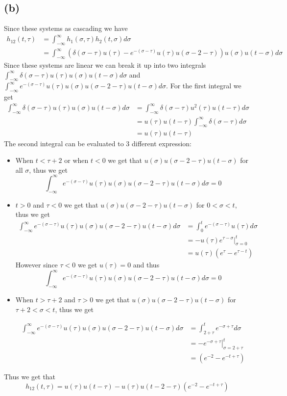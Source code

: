 \documentclass[12pt]{article}
\begin{document}
\subsection*{(b)}
Since these systems as cascading we have
\begin{align*}
h_{12}(t,\tau)&=\int_{-\infty}^{\infty}h_1(\sigma,\tau)h_2(t,\sigma)d\sigma\\
&=\int_{-\infty}^{\infty}\left(\delta(\sigma-\tau)u(\tau)-e^{-(\sigma-\tau)}u(\tau)u(\sigma-2-\tau)\right)u(\sigma)u(t-\sigma)d\sigma
\end{align*}
Since these systems are linear we can break it up into two integrals $\int_{-\infty}^{\infty}\delta(\sigma-\tau)u(\tau)u(\sigma)u(t-\sigma)d\sigma$ and $\int_{-\infty}^{\infty}e^{-(\sigma-\tau)}u(\tau)u(\sigma)u(\sigma-2-\tau)u(t-\sigma)d\sigma$. For the first integral we get
\begin{align*}
\int_{-\infty}^{\infty}\delta(\sigma-\tau)u(\tau)u(\sigma)u(t-\sigma)d\sigma&=\int_{-\infty}^{\infty}\delta(\sigma-\tau)u^2(\tau)u(t-\tau)d\sigma\\
&=u(\tau)u(t-\tau)\int_{-\infty}^{\infty}\delta(\sigma-\tau)d\sigma\\
&=u(\tau)u(t-\tau)
\end{align*}
The second integral can be evaluated to 3 different expression:
\begin{itemize}
\item When $t<\tau+2$ or when $t<0$ we get that $u(\sigma)u(\sigma-2-\tau)u(t-\sigma)$ for all $\sigma$, thus we get
$$\int_{-\infty}^{\infty}e^{-(\sigma-\tau)}u(\tau)u(\sigma)u(\sigma-2-\tau)u(t-\sigma)d\sigma=0$$
\item $t>0$ and $\tau<0$ we get that 
$u(\sigma)u(\sigma-2-\tau)u(t-\sigma)$ for $0<\sigma<t$, thus we get
\begin{align*}
\int_{-\infty}^{\infty}e^{-(\sigma-\tau)}u(\tau)u(\sigma)u(\sigma-2-\tau)u(t-\sigma)d\sigma&=\int_{0}^{t}e^{-(\sigma-\tau)}u(\tau)d\sigma\\
&=-u(\tau)\left.e^{\tau-\sigma}\right|_{\sigma=0}^{t}\\
&=u(\tau)(e^\tau-e^{\tau-t})
\end{align*}
However since $\tau<0$ we get $u(\tau)=0$ and thus $$\int_{-\infty}^{\infty}e^{-(\sigma-\tau)}u(\tau)u(\sigma)u(\sigma-2-\tau)u(t-\sigma)d\sigma=0$$
\item When $t>\tau+2$ and $\tau>0$ we get that $u(\sigma)u(\sigma-2-\tau)u(t-\sigma)$ for $\tau+2<\sigma<t$, thus we get

\begin{align*}
\int_{-\infty}^{\infty}e^{-(\sigma-\tau)}u(\tau)u(\sigma)u(\sigma-2-\tau)u(t-\sigma)d\sigma&=\int_{2+\tau}^{t}e^{-\sigma+\tau}d\sigma\\
&=\left.-e^{-\sigma+\tau}\right|_{\sigma=2+\tau}^{t}\\
&=(e^{-2}-e^{-t+\tau})
\end{align*}
\end{itemize}
Thus we get that 
$$h_{12}(t,\tau)=\boxed{u(\tau)u(t-\tau)-u(\tau)u(t-2-\tau)(e^{-2}-e^{-t+\tau})}$$
\end{document}
